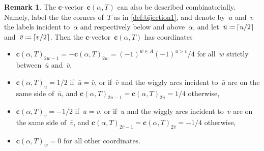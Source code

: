 \documentclass{amsart}
\theoremstyle{definition}
\newtheorem{remark}[theorem]{Remark}
\renewcommand{\b}[1]{{\boldsymbol{#1}}} %
\newcommand{\eqdef}{\mbox{\,\raisebox{0.2ex}{\scriptsize\ensuremath{\mathrm:}}\ensuremath{=}\,}} %
\begin{document}
\begin{remark}
The $\b{c}$-vector~$\b{c}(\alpha, T)$ can also be described combinatorially.
Namely, label the the corners of~$T$ as in \cref{def:bijection1}, and denote by~$u$ and~$v$ the labels incident to~$\alpha$ and respectively below and above~$\alpha$, and let~$\bar u \eqdef \lceil u/2 \rceil$ and~$\bar v \eqdef \lceil v/2 \rceil$.
Then the $\b{c}$-vector~$\b{c}(\alpha, T)$ has coordinates
\begin{itemize}
\item $\b{c}(\alpha, T)_{2w-1} = - \b{c}(\alpha, T)_{2w} = (-1)^{w \in A} (-1)^{u>v}/4$ for all~$w$ strictly between~$\bar u$ and~$\bar v$,
\item $\b{c}(\alpha, T)_u = 1/2$ if~$\bar u = \bar v$, or if~$\bar v$ and the wiggly arcs incident to~$\bar u$ are on the same side of~$\bar u$, and $\b{c}(\alpha, T)_{2\bar u-1} = \b{c}(\alpha, T)_{2\bar u} = 1/4$ otherwise,
\item $\b{c}(\alpha, T)_v = -1/2$ if~$\bar u = \bar v$, or if~$\bar u$ and the wiggly arcs incident to~$\bar v$ are on the same side of~$\bar v$, and $\b{c}(\alpha, T)_{2\bar v-1} = \b{c}(\alpha, T)_{2\bar v} = -1/4$ otherwise,
\item $\b{c}(\alpha, T)_w = 0$ for all other coordinates.
\end{itemize}
\end{remark}
\end{document}
